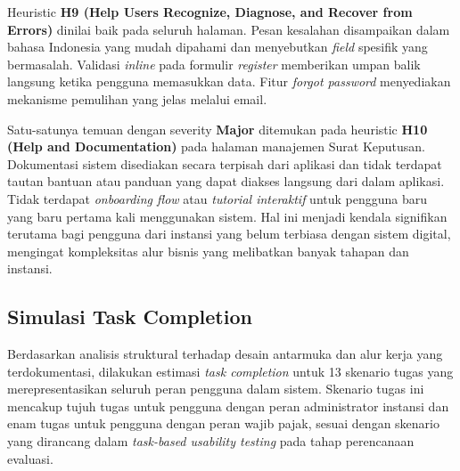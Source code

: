 \documentclass[conference]{IEEEtran}
\begin{document}
Heuristic \textbf{H9 (Help Users Recognize, Diagnose, and Recover from Errors)} dinilai
baik pada seluruh halaman. Pesan kesalahan disampaikan dalam bahasa Indonesia yang
mudah dipahami dan menyebutkan \emph{field} spesifik yang bermasalah. Validasi \emph{inline}
pada formulir \emph{register} memberikan umpan balik langsung ketika pengguna memasukkan
data. Fitur \emph{forgot password} menyediakan mekanisme pemulihan yang jelas melalui email.

Satu-satunya temuan dengan severity \textbf{Major} ditemukan pada heuristic
\textbf{H10 (Help and Documentation)} pada halaman manajemen Surat Keputusan.
Dokumentasi sistem disediakan secara terpisah dari aplikasi dan tidak terdapat tautan
bantuan atau panduan yang dapat diakses langsung dari dalam aplikasi. Tidak terdapat
\emph{onboarding flow} atau \emph{tutorial interaktif} untuk pengguna baru yang baru
pertama kali menggunakan sistem. Hal ini menjadi kendala signifikan terutama bagi
pengguna dari instansi yang belum terbiasa dengan sistem digital, mengingat kompleksitas
alur bisnis yang melibatkan banyak tahapan dan instansi.

\subsection{Simulasi Task Completion}
\label{subsec:task-completion}

Berdasarkan analisis struktural terhadap desain antarmuka dan alur kerja yang terdokumentasi,
dilakukan estimasi \emph{task completion} untuk 13 skenario tugas yang merepresentasikan
seluruh peran pengguna dalam sistem. Skenario tugas ini mencakup tujuh tugas untuk
pengguna dengan peran administrator instansi dan enam tugas untuk pengguna dengan peran
wajib pajak, sesuai dengan skenario yang dirancang dalam \emph{task-based usability
testing} pada tahap perencanaan evaluasi.
\end{document}
